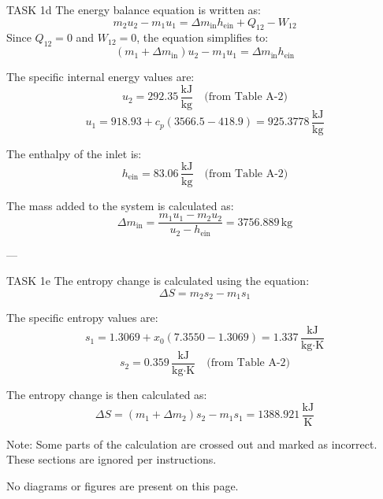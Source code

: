 TASK 1d  
The energy balance equation is written as:  
\[
m_2 u_2 - m_1 u_1 = \Delta m_{\text{in}} h_{\text{ein}} + Q_{12} - W_{12}
\]  
Since \( Q_{12} = 0 \) and \( W_{12} = 0 \), the equation simplifies to:  
\[
(m_1 + \Delta m_{\text{in}}) u_2 - m_1 u_1 = \Delta m_{\text{in}} h_{\text{ein}}
\]  

The specific internal energy values are:  
\[
u_2 = 292.35 \, \frac{\text{kJ}}{\text{kg}} \quad \text{(from Table A-2)}
\]  
\[
u_1 = 918.93 + c_p (3566.5 - 418.9) = 925.3778 \, \frac{\text{kJ}}{\text{kg}}
\]  

The enthalpy of the inlet is:  
\[
h_{\text{ein}} = 83.06 \, \frac{\text{kJ}}{\text{kg}} \quad \text{(from Table A-2)}
\]  

The mass added to the system is calculated as:  
\[
\Delta m_{\text{in}} = \frac{m_1 u_1 - m_2 u_2}{u_2 - h_{\text{ein}}} = 3756.889 \, \text{kg}
\]  

---

TASK 1e  
The entropy change is calculated using the equation:  
\[
\Delta S = m_2 s_2 - m_1 s_1
\]  

The specific entropy values are:  
\[
s_1 = 1.3069 + x_0 (7.3550 - 1.3069) = 1.337 \, \frac{\text{kJ}}{\text{kg·K}}
\]  
\[
s_2 = 0.359 \, \frac{\text{kJ}}{\text{kg·K}} \quad \text{(from Table A-2)}
\]  

The entropy change is then calculated as:  
\[
\Delta S = (m_1 + \Delta m_2) s_2 - m_1 s_1 = 1388.921 \, \frac{\text{kJ}}{\text{K}}
\]  

Note: Some parts of the calculation are crossed out and marked as incorrect. These sections are ignored per instructions.  

No diagrams or figures are present on this page.